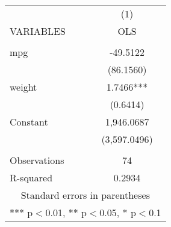 \begin{tabular}{lc} \hline
 & (1) \\
VARIABLES & OLS \\ \hline
 &  \\
mpg & -49.5122 \\
 & (86.1560) \\
weight & 1.7466*** \\
 & (0.6414) \\
Constant & 1,946.0687 \\
 & (3,597.0496) \\
 &  \\
Observations & 74 \\
 R-squared & 0.2934 \\ \hline
\multicolumn{2}{c}{ Standard errors in parentheses} \\
\multicolumn{2}{c}{ *** p$<$0.01, ** p$<$0.05, * p$<$0.1} \\
\end{tabular}
